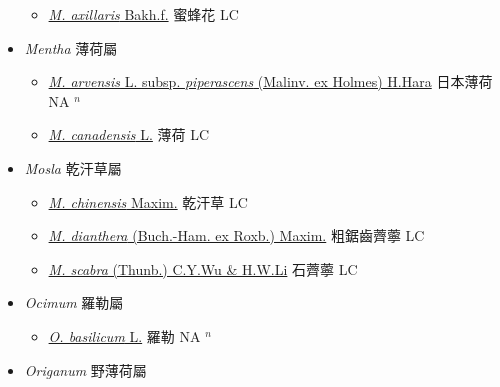 \begin{itemize}
  \begin{itemize}
        \item[] \href{http://www.theplantlist.org/tpl1.1/search?q=Melissa+axillaris}{\textit{M. axillaris} Bakh.f.}   蜜蜂花 LC
  \end{itemize}
 \item[] \textit{Mentha} 薄荷屬
                    
  \begin{itemize}
        \item[] \href{http://www.theplantlist.org/tpl1.1/search?q=Mentha+arvensis+subsp.+piperascens}{\textit{M. arvensis} L. subsp. \textit{piperascens} (Malinv. ex Holmes) H.Hara}   日本薄荷 NA $^n$
        \item[] \href{http://www.theplantlist.org/tpl1.1/search?q=Mentha+canadensis}{\textit{M. canadensis} L.}   薄荷 LC
  \end{itemize}
 \item[] \textit{Mosla} 乾汗草屬
                    
  \begin{itemize}
        \item[] \href{http://www.theplantlist.org/tpl1.1/search?q=Mosla+chinensis}{\textit{M. chinensis} Maxim.}   乾汗草 LC
        \item[] \href{http://www.theplantlist.org/tpl1.1/search?q=Mosla+dianthera}{\textit{M. dianthera} (Buch.-Ham. ex Roxb.) Maxim.}   粗鋸齒薺薴 LC
        \item[] \href{http://www.theplantlist.org/tpl1.1/search?q=Mosla+scabra}{\textit{M. scabra} (Thunb.) C.Y.Wu \& H.W.Li}   石薺薴 LC
  \end{itemize}
 \item[] \textit{Ocimum} 羅勒屬
                    
  \begin{itemize}
        \item[] \href{http://www.theplantlist.org/tpl1.1/search?q=Ocimum+basilicum}{\textit{O. basilicum} L.}   羅勒 NA $^n$
  \end{itemize}
 \item[] \textit{Origanum} 野薄荷屬
                    

\end{itemize}
